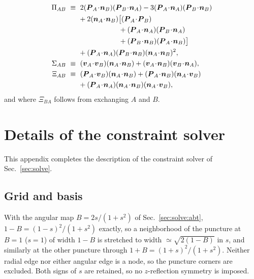 \documentclass[
  aps,
  prd,
  twocolumn,
  10pt,
  amsmath,
  amssymb,
  nofootinbib,
  superscriptaddress,
  floatfix,
]{revtex4-2}
\newcommand{\vect}[1]{\boldsymbol{#1}}
\begin{document}
\begin{align}
  \Pi_{AB} \ &\equiv \ 2(\vect{P}_A\!\cdot\!\vect{n}_B)(\vect{P}_B\!\cdot\!\vect{n}_A)
   - 3(\vect{P}_A\!\cdot\!\vect{n}_A)(\vect{P}_B\!\cdot\!\vect{n}_B) \nonumber\\
  &\hspace{5mm} + 2(\vect{n}_A\!\cdot\!\vect{n}_B)\bigl[ (\vect{P}_A\!\cdot\!\vect{P}_B) \nonumber \\
  &\hspace{25mm} + (\vect{P}_A\!\cdot\!\vect{n}_A)(\vect{P}_B\!\cdot\!\vect{n}_A) \nonumber\\
  &\hspace{25mm} + (\vect{P}_B\!\cdot\!\vect{n}_B)(\vect{P}_A\!\cdot\!\vect{n}_B)\bigr] \nonumber\\
  &\hspace{ 5mm} + (\vect{P}_A\!\cdot\!\vect{n}_A)(\vect{P}_B\!\cdot\!\vect{n}_B)(\vect{n}_A\!\cdot\!\vect{n}_B)^2 ,
  \label{eq:invPi}\\
  \Sigma_{AB} \ &\equiv \ (\vect{v}_A\!\cdot\!\vect{v}_B)(\vect{n}_A\!\cdot\!\vect{n}_B) + (\vect{v}_A\!\cdot\!\vect{n}_B)(\vect{v}_B\!\cdot\!\vect{n}_A) ,
  \label{eq:invSigma}\\
  \Xi_{AB} \ &\equiv \ (\vect{P}_A\!\cdot\!\vect{v}_B)(\vect{n}_A\!\cdot\!\vect{n}_B)
   + (\vect{P}_A\!\cdot\!\vect{n}_B)(\vect{n}_A\!\cdot\!\vect{v}_B) \nonumber\\
  & \hspace{5mm} + (\vect{P}_A\!\cdot\!\vect{n}_A)(\vect{n}_A\!\cdot\!\vect{n}_B)(\vect{n}_A\!\cdot\!\vect{v}_B) ,
  \label{eq:invXi}
\end{align}
and where $\Xi_{BA}$ follows from exchanging $A$ and $B$.


\section{Details of the constraint solver}
\label{sec:solverdetails}

This appendix completes the description of the constraint solver of Sec.~\ref{sec:solve}.

\subsection{Grid and basis}
\label{sec:solverdetails:grid}

With the angular map $B=2s/(1+s^2)$ of Sec.~\ref{sec:solve:abt}, $1-B=(1-s)^2/(1+s^2)$ exactly, so a neighborhood of the puncture at $B=1$ ($s=1$) of width $1-B$ is stretched to width $\simeq\sqrt{2(1-B)}$ in $s$, and similarly at the other puncture through $1+B=(1+s)^2/(1+s^2)$.
Neither radial edge nor either angular edge is a node, so the puncture corners are excluded.
Both signs of $s$ are retained, so no $z$-reflection symmetry is imposed.
\end{document}
